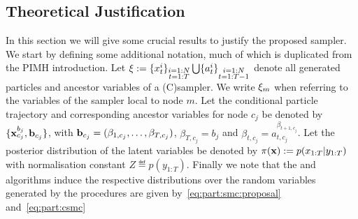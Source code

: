 \subsection{Theoretical Justification}
\label{sec:part:ipmcmc:theory}
In this section we will give some crucial results to justify the proposed \ipmc sampler.
We start by defining some additional notation, much of which is duplicated from the PIMH introduction.
Let $\mathbf{\xi} := \{x_{t}^i\}_{\substack{i=1:N\\t=1:T}} \bigcup \{a_{t}^i\}_{\substack{i=1:N\\t=1:T-1}}$
denote all generated particles and ancestor variables of a (C)\smc sampler.
We write $\mathbf{\xi}_m$ when referring to the variables of the sampler local to node $m$.
%
Let the conditional particle trajectory and corresponding ancestor variables for node $c_j$ be denoted by $\{\mathbf{x}_{c_j}^{b_j},\mathbf{b}_{c_j}\}$, with $\mathbf{b}_{c_j} = (\beta_{1,c_j},\ldots,\beta_{T,c_j})$,
$\beta_{T,c_j} = b_j$ and $\beta_{t,c_j} = a_{t,c_j}^{\beta_{t+1,c_j}}$. %
Let the posterior distribution of the latent variables be denoted by $\pi(\mathbf{x}) := p(x_{1:T}|y_{1:T})$ with normalisation constant $Z \eqdef p(y_{1:T})$. 
%
Finally we %
note that the \smc and \csmc algorithms induce the respective distributions over the random variables
generated by the procedures are given by~\eqref{eq:part:smc:proposal} and~\eqref{eq:part:csmc}
